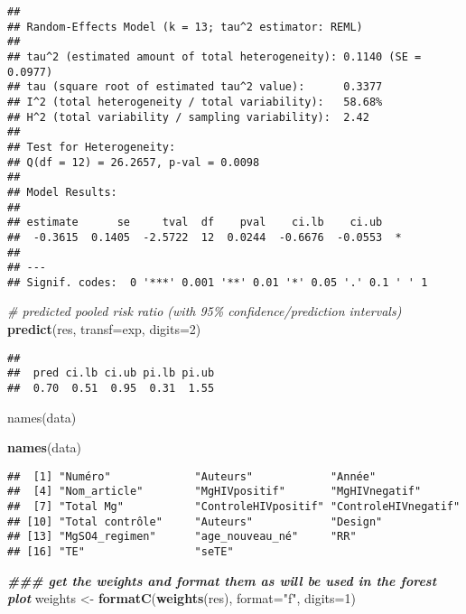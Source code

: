 \documentclass[
]{article}
\newenvironment{Shaded}{\begin{snugshade}}{\end{snugshade}}
\newcommand{\AttributeTok}[1]{\textcolor[rgb]{0.13,0.29,0.53}{#1}}
\newcommand{\CommentTok}[1]{\textcolor[rgb]{0.56,0.35,0.01}{\textit{#1}}}
\newcommand{\DecValTok}[1]{\textcolor[rgb]{0.00,0.00,0.81}{#1}}
\newcommand{\DocumentationTok}[1]{\textcolor[rgb]{0.56,0.35,0.01}{\textbf{\textit{#1}}}}
\newcommand{\FunctionTok}[1]{\textcolor[rgb]{0.13,0.29,0.53}{\textbf{#1}}}
\newcommand{\NormalTok}[1]{#1}
\newcommand{\OtherTok}[1]{\textcolor[rgb]{0.56,0.35,0.01}{#1}}
\newcommand{\StringTok}[1]{\textcolor[rgb]{0.31,0.60,0.02}{#1}}
\begin{document}
\begin{verbatim}
## 
## Random-Effects Model (k = 13; tau^2 estimator: REML)
## 
## tau^2 (estimated amount of total heterogeneity): 0.1140 (SE = 0.0977)
## tau (square root of estimated tau^2 value):      0.3377
## I^2 (total heterogeneity / total variability):   58.68%
## H^2 (total variability / sampling variability):  2.42
## 
## Test for Heterogeneity:
## Q(df = 12) = 26.2657, p-val = 0.0098
## 
## Model Results:
## 
## estimate      se     tval  df    pval    ci.lb    ci.ub    
##  -0.3615  0.1405  -2.5722  12  0.0244  -0.6676  -0.0553  * 
## 
## ---
## Signif. codes:  0 '***' 0.001 '**' 0.01 '*' 0.05 '.' 0.1 ' ' 1
\end{verbatim}

\begin{Shaded}
\begin{Highlighting}[]
\CommentTok{\# predicted pooled risk ratio (with 95\% confidence/prediction intervals)}
\FunctionTok{predict}\NormalTok{(res, }\AttributeTok{transf=}\NormalTok{exp, }\AttributeTok{digits=}\DecValTok{2}\NormalTok{)}
\end{Highlighting}
\end{Shaded}

\begin{verbatim}
## 
##  pred ci.lb ci.ub pi.lb pi.ub 
##  0.70  0.51  0.95  0.31  1.55
\end{verbatim}

names(data)

\begin{Shaded}
\begin{Highlighting}[]
\FunctionTok{names}\NormalTok{(data)}
\end{Highlighting}
\end{Shaded}

\begin{verbatim}
##  [1] "Numéro"             "Auteurs"            "Année"             
##  [4] "Nom_article"        "MgHIVpositif"       "MgHIVnegatif"      
##  [7] "Total Mg"           "ControleHIVpositif" "ControleHIVnegatif"
## [10] "Total contrôle"     "Auteurs"            "Design"            
## [13] "MgSO4_regimen"      "age_nouveau_né"     "RR"                
## [16] "TE"                 "seTE"
\end{verbatim}

\begin{Shaded}
\begin{Highlighting}[]
\DocumentationTok{\#\#\# get the weights and format them as will be used in the forest plot}
\NormalTok{weights }\OtherTok{\textless{}{-}} \FunctionTok{formatC}\NormalTok{(}\FunctionTok{weights}\NormalTok{(res), }\AttributeTok{format=}\StringTok{"f"}\NormalTok{, }\AttributeTok{digits=}\DecValTok{1}\NormalTok{)}
\end{Highlighting}
\end{Shaded}
\end{document}
